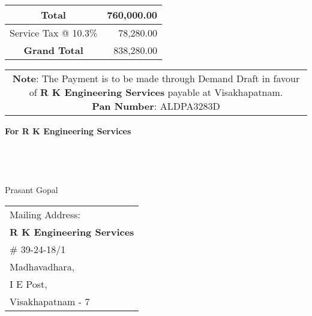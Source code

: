 \documentclass[11pt]{article}
\begin{document}
\vspace*{0.2cm}

\hspace*{11.50cm}
\begin{tabular}{|c|r|}
\hline
Total & 760,000.00 \\
\hline
Service Tax @ 10.3\% & 78,280.00 \\
\hline
{\bf Grand Total} & 838,280.00 \\
\hline
\end{tabular}

\vspace*{-1 cm}
\begin{tabular}{c}
\parbox{4in}{ {\bf Note}: The Payment is to be made through Demand Draft in favour of {\bf R K Engineering Services} payable at Visakhapatnam. \\
{\noindent \bf Pan Number}:  ALDPA3283D }\\
\end{tabular}
\vspace*{55pt}


{\bf For  R K Engineering Services } \\ \\ \\ \\ \\
 \hspace*{0.6cm}Prasant Gopal
\vspace*{-71pt}
\begin{flushright}
\begin{tabular}{l}
Mailing Address:\\
{\bf R K Engineering Services}\\
\# 39-24-18/1\\
Madhavadhara, \\ 
I E Post, \\
Visakhapatnam - 7\\
\end{tabular}
\end{flushright}
\end{document}
